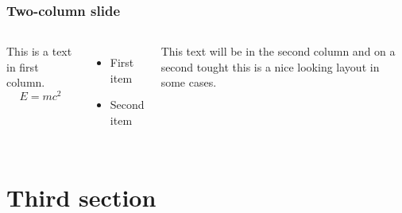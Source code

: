 \documentclass{beamer}
\begin{document}
\begin{frame}
	\frametitle{Two-column slide}

	\begin{columns}

		This is a text in first column.
		$$E=mc^2$$
		\begin{itemize}
			\item First item
			\item Second item
		\end{itemize}

		This text will be in the second column
		and on a second tought this is a nice looking
		layout in some cases.
	\end{columns}
\end{frame}

\section{Third section}




\end{document}
